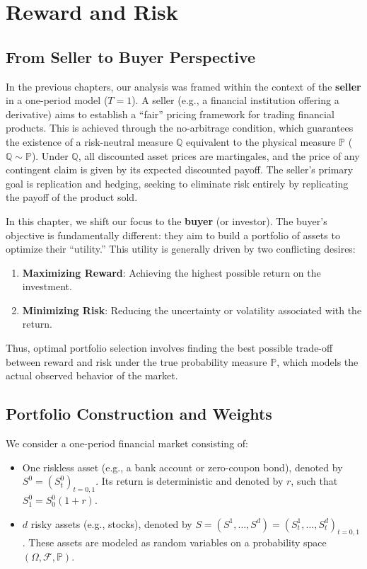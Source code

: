 \chapter{Reward and Risk}

\section{From Seller to Buyer Perspective}

In the previous chapters, our analysis was framed within the context of the \textbf{seller} in a one-period model ($T=1$). A seller (e.g., a financial institution offering a derivative) aims to establish a ``fair'' pricing framework for trading financial products. This is achieved through the no-arbitrage condition, which guarantees the existence of a risk-neutral measure $\mathbb{Q}$ equivalent to the physical measure $\mathbb{P}$ ($\mathbb{Q} \sim \mathbb{P}$). Under $\mathbb{Q}$, all discounted asset prices are martingales, and the price of any contingent claim is given by its expected discounted payoff. The seller's primary goal is replication and hedging, seeking to eliminate risk entirely by replicating the payoff of the product sold.

In this chapter, we shift our focus to the \textbf{buyer} (or investor). The buyer's objective is fundamentally different: they aim to build a portfolio of assets to optimize their ``utility.'' This utility is generally driven by two conflicting desires:
\begin{enumerate}
    \item \textbf{Maximizing Reward}: Achieving the highest possible return on the investment.
    \item \textbf{Minimizing Risk}: Reducing the uncertainty or volatility associated with the return.
\end{enumerate}
Thus, optimal portfolio selection involves finding the best possible trade-off between reward and risk under the true probability measure $\mathbb{P}$, which models the actual observed behavior of the market.

\section{Portfolio Construction and Weights}

We consider a one-period financial market consisting of:
\begin{itemize}
    \item One riskless asset (e.g., a bank account or zero-coupon bond), denoted by $S^0 = (S_t^0)_{t=0,1}$. Its return is deterministic and denoted by $r$, such that $S_1^0 = S_0^0(1+r)$.
    \item $d$ risky assets (e.g., stocks), denoted by $S = (S^1, \dots, S^d) = (S_t^1, \dots, S_t^d)_{t=0,1}$. These assets are modeled as random variables on a probability space $(\Omega, \mathcal{F}, \mathbb{P})$.
\end{itemize}

